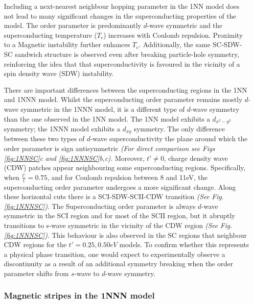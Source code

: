 \documentclass[11pt]{article}
\begin{document}
\noindent Including a next-nearest neighbour hopping parameter in the 1NN model does not lead to
many significant changes in the superconducting properties of the model. The order parameter is predominantly $d$-wave symmetric and the  superconducting temperature ($T_c$) increases
with Coulomb repulsion. Proximity to a Magnetic instability further enhances $T_c$.
Additionally, the same SC-SDW-SC sandwich structure is observed even after breaking particle-hole symmetry, reinforcing the 
idea that that superconductivity is favoured in the vicinity of a  spin density wave (SDW) instability. \par
\medskip
\noindent There are important differences between the superconducting regions in the 1NN and 1NNN model. 
Whilst the superconducting order parameter remains mostly $d$-wave symmetric in the 1NNN model, it is a different type
of $d$-wave symmetry than the one observed in the 1NN model. The 1NN model exhibits a $d_{x^2-y^2}$ symmetry; the 1NNN model
exhibits a $d_{xy}$ symmetry\cite{butler2012point}. The only difference between these two types of $d$-wave superconductivity the plane around which the order parameter is sign antisymmetric
\textit{(For direct comparison see Figs \ref{fig:1NNSC}c and \ref{fig:1NNNSC}b,c)}. 
Moreover,  $t' \neq 0 $, charge density wave (CDW) patches appear neighbouring some superconducting regions.
Specifically, when $\frac{t'}{t} = 0.75$, and for Coulomb repulsion between 8 and 11eV, the superconducting order parameter undergoes a more significant change.
Along these horizontal cuts there is a SCI-SDW-SCII-CDW transition \textit{(See Fig.\ref{fig:1NNNSC})}. The Superconducting order parameter 
is always $d$-wave symmetric in the SCI region and for most of the SCII region, but it abruptly transitions to 
s-wave symmetric in the vicinity of the CDW region \textit{(See Fig.\ref{fig:1NNNSC})}. This behaviour is also observed in the SC regions that neighbour CDW regions for 
the $t' = 0.25, 0.50eV$ models. To confirm whether this represents a physical phase transition, one would expect to experimentally observe a 
discontinuity as a result of an additional symmetry breaking when the order parameter shifts from $s$-wave to $d$-wave symmetry.





\subsubsection{Magnetic stripes in the 1NNN model}
\label{subsec:Stripes1NNN}
\end{document}
